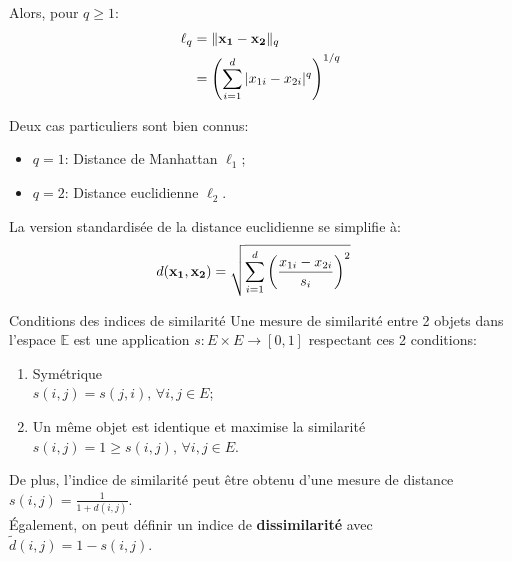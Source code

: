 \documentclass[10pt, french]{article}
\begin{document}
\begin{multicols*}{3}
\begin{definitionNOHFILL}
Alors, pour $q \ge 1$:
\begin{align*}
	\ell_{q}
	&=	\Vert \mathbf{x_{1} - x_{2}} \Vert_{q}	\\
	&=	\left( \sum_{i = 1}^{d} |x_{1i} - x_{2i}|^{q} \right)^{1/q}	\\
\end{align*}

Deux cas particuliers sont bien connus:
\begin{itemize}[leftmargin = *]
	\item	$q = 1$:	Distance de Manhattan $\ell_{1}$;
	\item	$q = 2$:	Distance euclidienne $\ell_{2}$.
\end{itemize}

\tcbline

La version standardisée de la distance euclidienne se simplifie à:
\begin{align*}
	d(\mathbf{x_{1}, x_{2}})
	&=	\sqrt{\sum_{i = 1}^{d} \left( \frac{x_{1i} - x_{2i}}{s_{i}} \right)^{2}}
\end{align*}
\end{definitionNOHFILL}

\begin{conceptgen}{Conditions des indices de similarité}
Une mesure de similarité entre 2 objets dans l'espace $\mathbb{E}$ est une application $s : E \times E \rightarrow [0, 1]$ respectant ces 2 conditions:
\begin{enumerate}[leftmargin = *]
	\item	Symétrique\\
	$s(i, j) = s(j, i), \, \forall i, j \in E$;
	\item	Un même objet est identique et maximise la similarité\\
	$s(i, j) = 1 \ge s(i, j), \, \forall i, j \in E$.
\end{enumerate}

\tcbline

De plus, l'indice de similarité peut être obtenu d'une mesure de distance $s(i, j) = \frac{1}{1 + d(i, j)}$.\\
Également, on peut définir un indice de \textbf{dissimilarité} avec $\tilde{d}(i, j) = 1 - s(i, j)$.
\end{conceptgen}


\end{multicols*}
\end{document}
